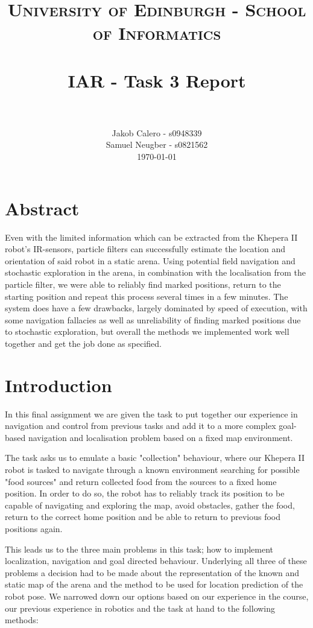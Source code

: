 \documentclass[paper=a4, fontsize=12pt]{scrartcl}	%
\title{
\vspace{-1in} 	
\usefont{OT1}{bch}{b}{n}
\normalfont \normalsize \textsc{University of Edinburgh - School of Informatics}
\\ [25pt]
\horrule{0.5pt} \\[0.4cm]
\large IAR - Task 3 Report \\
\horrule{1pt} \\[0.5cm]
}
\author{
  \normalfont \normalsize
  Jakob Calero - s0948339\\[-3pt]\normalsize
  Samuel Neugber - s0821562\\[-3pt]\normalsize
  \today
}
\date{}
\numberwithin{equation}{section}		%
\numberwithin{figure}{section}			%
\numberwithin{table}{section}				%
\begin{document}
\maketitle					%
\section{Abstract}
Even with the limited information which can be extracted from the Khepera II robot's IR-sensors, particle filters can successfully estimate the location and orientation of said robot in a static arena. Using potential field navigation and stochastic exploration in the arena, in combination with the localisation from the particle filter, we were able to reliably find marked positions, return to the starting position and repeat this process several times in a few minutes. The system does have a few drawbacks, largely dominated by speed of execution, with some navigation fallacies as well as unreliability of finding marked positions due to stochastic exploration, but overall the methods we implemented work well together and get the job done as specified.

\section{Introduction}
In this final assignment we are given the task to put together our experience in navigation and control from previous tasks and add it to a more complex goal-based navigation and localisation problem based on a fixed map environment.

The task asks us to emulate a basic "collection" behaviour, where our Khepera II robot is tasked to navigate through a known environment searching for possible "food sources" and return collected food from the sources to a fixed home position. In order to do so, the robot has to reliably track its position to be capable of navigating and exploring the map, avoid obstacles, gather the food, return to the correct home position and be able to return to previous food positions again.

This leads us to the three main problems in this task; how to implement localization, navigation and goal directed behaviour. Underlying all three of these problems a decision had to be made about the representation of the known and static map of the arena and the method to be used for location prediction of the robot pose. We narrowed down our options based on our experience in the course, our previous experience in robotics and the task at hand to the following methods:
\end{document}
